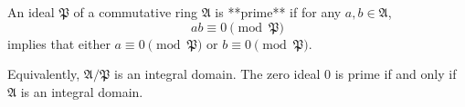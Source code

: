 An ideal $\mathfrak{P}$ of a commutative ring $\mathfrak{A}$ is **prime** if for any $a, b \in \mathfrak{A}$,
$$ab \equiv 0 \pmod{\mathfrak{P}}$$
implies that either $a \equiv 0 \pmod{\mathfrak{P}}$ or $b \equiv 0 \pmod{\mathfrak{P}}$.

Equivalently, $\mathfrak{A}/\mathfrak{P}$ is an integral domain. The zero ideal $0$ is prime if and only if $\mathfrak{A}$ is an integral domain.
